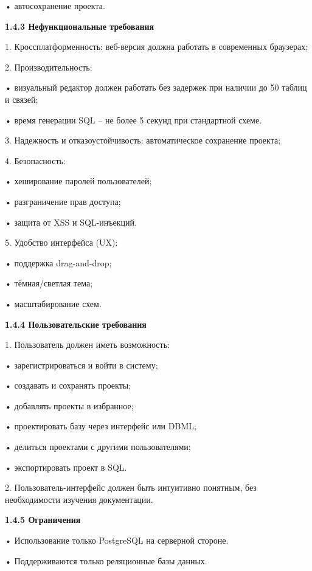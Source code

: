 	•	автосохранение проекта.
    

\textbf{1.4.3 Нефункциональные требования }

	1.	Кроссплатформенность: веб-версия должна работать в современных браузерах;
        
	2.	Производительность:
    
	•	визуальный редактор должен работать без задержек при наличии до 50 таблиц и связей;
    
	•	время генерации SQL – не более 5 секунд при стандартной схеме.
    
	3.	Надежность и отказоустойчивость: автоматическое сохранение проекта;
    
	4.	Безопасность:
    
	•	хеширование паролей пользователей;
    
	•	разграничение прав доступа;
    
	•	защита от XSS и SQL-инъекций.
    
	5.	Удобство интерфейса (UX):
    
	•	поддержка drag-and-drop;
    
	•	тёмная/светлая тема;
    
	•	масштабирование схем.

\textbf{1.4.4 Пользовательские требования }

	1.	Пользователь должен иметь возможность:
    
	•	зарегистрироваться и войти в систему;
    
	•	создавать и сохранять проекты;
    
	•	добавлять проекты в избранное;
    
	•	проектировать базу через интерфейс или DBML;
    
	•	делиться проектами с другими пользователями;
    
	•	экспортировать проект в SQL.
    
	2.	Пользователь-интерфейс должен быть интуитивно понятным, без необходимости изучения документации.

\textbf{1.4.5 Ограничения}

	•	Использование только PostgreSQL на серверной стороне.
    
	•	Поддерживаются только реляционные базы данных.
    

